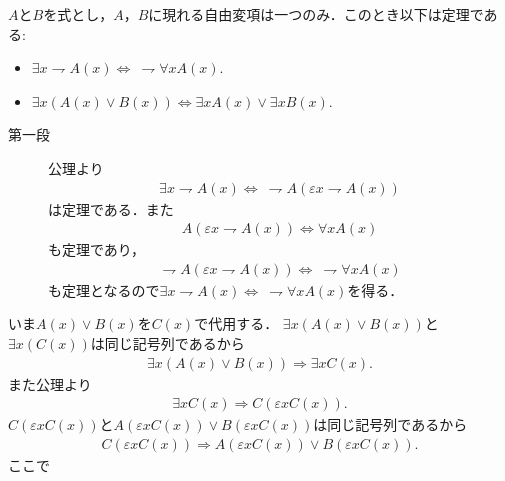 	\begin{screen}
		\begin{metathm}
			$A$と$B$を式とし，$A$，$B$に現れる自由変項は一つのみ．このとき以下は定理である:
			\begin{itemize}
				\item $\exists x \rightharpoondown A(x) \Longleftrightarrow\ \rightharpoondown \forall x A(x)$.
				\item $\exists x ( A(x) \vee B(x) ) \Longleftrightarrow \exists x A(x) \vee \exists x B(x)$.
			\end{itemize}
		\end{metathm}
	\end{screen}
	
	\begin{prf}\mbox{}
		\begin{description}
			\item[第一段]
				公理より
				\begin{align}
					\exists x \rightharpoondown A(x) \Longleftrightarrow\ 
					\rightharpoondown A(\varepsilon x \rightharpoondown A(x))
				\end{align}
				は定理である．また
				\begin{align}
					A(\varepsilon x \rightharpoondown A(x)) \Longleftrightarrow \forall x A(x) 
				\end{align}
				も定理であり，
				\begin{align}
					\rightharpoondown A(\varepsilon x \rightharpoondown A(x)) \Longleftrightarrow\ 
					\rightharpoondown \forall x A(x)
				\end{align}
				も定理となるので$\exists x \rightharpoondown A(x) \Longleftrightarrow\ \rightharpoondown \forall x A(x)$を得る．
		\end{description}
		いま$A(x) \vee B(x)$を$C(x)$で代用する．
		$\exists x ( A(x) \vee B(x) )$と$\exists x ( C(x) )$は同じ記号列であるから
		\begin{align}
			\exists x ( A(x) \vee B(x) ) \Longrightarrow \exists x C(x).
		\end{align}
		また公理より
		\begin{align}
			\exists x C(x) \Longrightarrow C(\varepsilon x C(x)).
		\end{align}
		$C(\varepsilon x C(x))$と$A(\varepsilon x C(x)) \vee B(\varepsilon x C(x))$は同じ記号列であるから
		\begin{align}
			C(\varepsilon x C(x)) \Longrightarrow A(\varepsilon x C(x)) \vee B(\varepsilon x C(x)).
		\end{align}
		ここで

\end{prf}
